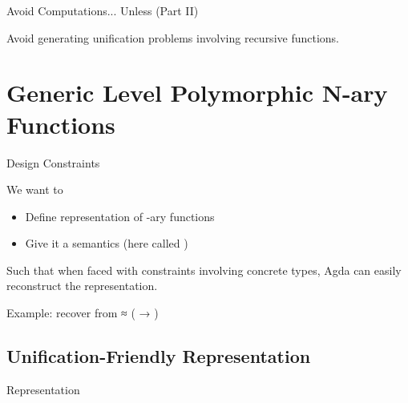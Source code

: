 \documentclass[compress,9pt]{beamer}
\begin{document}
\begin{frame}{Avoid Computations... Unless (Part II)}

  Avoid generating unification problems involving recursive functions.

  \begin{minipage}{0.45\textwidth}
  \end{minipage}\begin{minipage}{0.45\textwidth}
  \end{minipage}
  \bigskip
\end{frame}

\section{Generic Level Polymorphic N-ary Functions}

\begin{frame}{Design Constraints}

  We want to
  \begin{itemize}
    \item Define representation of -ary functions
    \item Give it a semantics (here called )
  \end{itemize}

  \bigskip
  Such that when faced with constraints involving concrete types,
  Agda can easily reconstruct the representation.

  \bigskip
  Example: recover  from {   ≈ ( → )}
\end{frame}

\subsection{Unification-Friendly Representation}

\begin{frame}{Representation}
  \begin{minipage}{0.5\textwidth}
  \end{minipage}\begin{minipage}{0.4\textwidth}
  \end{minipage}
\end{frame}
\end{document}
